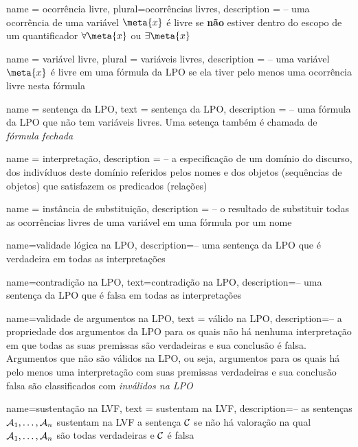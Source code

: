 {
 name = ocorrência livre,
 plural=ocorrências livres,
 description = {-- uma ocorrência de uma variável $\meta{x}$ é livre se \textbf{não} estiver dentro do escopo de um quantificador $\forall{\meta{x}}$ ou $\exists{\meta{x}}$}
}

{
 name = variável livre,
 plural = variáveis livres,
 description = {-- uma variável $\meta{x}$ é livre em uma fórmula da LPO se ela tiver pelo menos uma ocorrência livre nesta fórmula}
}

{
 name = sentença da LPO,
 text = sentença da LPO,
 description = {-- uma fórmula da LPO que não tem variáveis livres. Uma setença também é chamada de \textit{fórmula fechada}}
}

{
 name = {interpretação},
 description = {-- a especificação de um domínio do discurso, dos indivíduos deste domínio referidos pelos nomes e dos objetos (sequências de objetos) que satisfazem os predicados (relações)}
}

{
 name = instância de substituição,
 description = {-- o resultado de substituir todas as ocorrências livres de uma variável em uma fórmula por um nome}
}

{
 name=validade lógica na LPO,
 description={-- uma sentença da LPO que é verdadeira em todas as interpretações}
}

{
 name=contradição na LPO,
 text=contradição na LPO,
 description={--  uma sentença da LPO que é falsa em todas as interpretações}
} 

{
 name=validade de argumentos na LPO,
 text = válido na LPO,
 description={-- a propriedade dos argumentos da LPO para os quais não há nenhuma interpretação em que todas as suas premissas são verdadeiras e sua conclusão é falsa. Argumentos que não são válidos na LPO, ou seja, argumentos para os quais há pelo menos uma interpretação com suas premissas verdadeiras e sua conclusão falsa são classificados com \textit{inválidos na LPO}}
 }

{
 name=sustentação na LVF,
 text = sustentam na LVF,
 description={-- as sentenças $\mathcal{A}_1, \ldots, \mathcal{A}_n$ sustentam na LVF a sentença $\mathcal{C}$ se não há valoração na qual $\mathcal{A}_1, \ldots, \mathcal{A}_n$ são todas verdadeiras e $\mathcal{C}$ é falsa}
}

